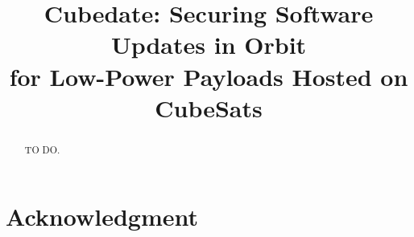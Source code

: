 \documentclass[conference]{IEEEtran}
\begin{document}

\title{Cubedate: Securing Software Updates in Orbit \\ for Low-Power Payloads Hosted on CubeSats}

\author{
}

\maketitle

\begin{abstract}
TO DO.
\end{abstract}

\IEEEpeerreviewmaketitle










\section*{Acknowledgment}



\end{document}
